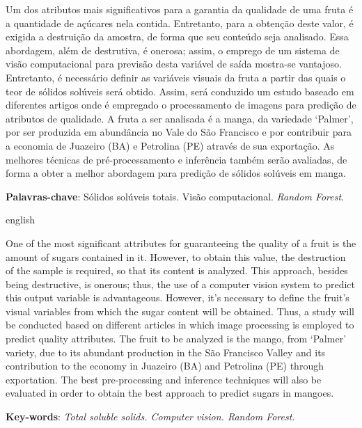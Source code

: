 \setlength{\absparsep}{18pt} %
\begin{resumo}

Um dos atributos mais significativos para a garantia da qualidade de uma fruta é a quantidade de açúcares nela contida. Entretanto, para a obtenção deste valor, é exigida a destruição da amostra, de forma que seu conteúdo seja analisado. Essa abordagem, além de destrutiva, é onerosa; assim, o emprego de um sistema de visão computacional para previsão desta variável de saída mostra-se vantajoso. Entretanto, é necessário definir as variáveis visuais da fruta a partir das quais o teor de sólidos solúveis será obtido. Assim, será conduzido um estudo baseado em diferentes artigos onde é empregado o processamento de imagens para predição de atributos de qualidade. A fruta a ser analisada é a manga, da variedade ‘Palmer’, por ser produzida em abundância no Vale do São Francisco e por contribuir para a economia de Juazeiro (BA) e Petrolina (PE) através de sua exportação. As melhores técnicas de pré-processamento e inferência também serão avaliadas, de forma a obter a melhor abordagem para predição de sólidos solúveis em manga. 

 \textbf{Palavras-chave}: Sólidos solúveis totais. Visão computacional. \textit{Random Forest}.

\end{resumo}

\begin{resumo}[Abstract]
\begin{otherlanguage*}{english}

One of the most significant attributes for guaranteeing the quality of a fruit is the amount of sugars contained in it. However, to obtain this value, the destruction of the sample is required, so that its content is analyzed. This approach, besides being destructive, is onerous; thus, the use of a computer vision system to predict this output variable is advantageous. However, it’s necessary to define the fruit’s visual variables from which the sugar content will be obtained. Thus, a study will be conducted based on different articles in which image processing is employed to predict quality attributes. The fruit to be analyzed is the mango, from ‘Palmer’ variety, due to its abundant production in the São Francisco Valley and its contribution to the economy in Juazeiro (BA) and Petrolina (PE) through exportation. The best pre-processing and inference techniques will also be evaluated in order to obtain the best approach to predict sugars in mangoes.  
	\vspace{\onelineskip}

	\noindent
	\textbf{Key-words}: \textit{Total soluble solids. Computer vision. Random Forest}.

\end{otherlanguage*}
\end{resumo}


